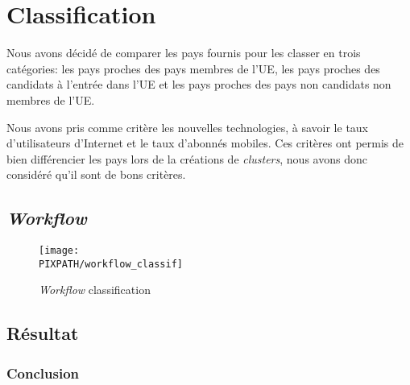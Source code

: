 \vfil
\pagebreak
\section{Classification}

Nous avons décidé de comparer les pays fournis pour
les classer en trois catégories: les pays proches des pays
membres de l'UE, les pays proches des candidats à l'entrée
dans l'UE et les pays proches des pays non candidats non
membres de l'UE.

Nous avons pris comme critère les nouvelles technologies, à savoir
le taux d'utilisateurs d'Internet et le taux d'abonnés mobiles.
Ces critères ont permis de bien différencier les pays lors de la
créations de {\sl clusters}, nous avons donc considéré qu'il
sont de bons critères.

\subsection{{\sl Workflow}}

\begin{sidewaysfigure}[!h]
\begin{center}
    \caption{{\sl Workflow} classification}
    \texttt{[image: \\PIXPATH/workflow\_classif]}

\end{center}
\end{sidewaysfigure}

\FloatBarrier

\subsection{Résultat}



\subsubsection{Conclusion}



